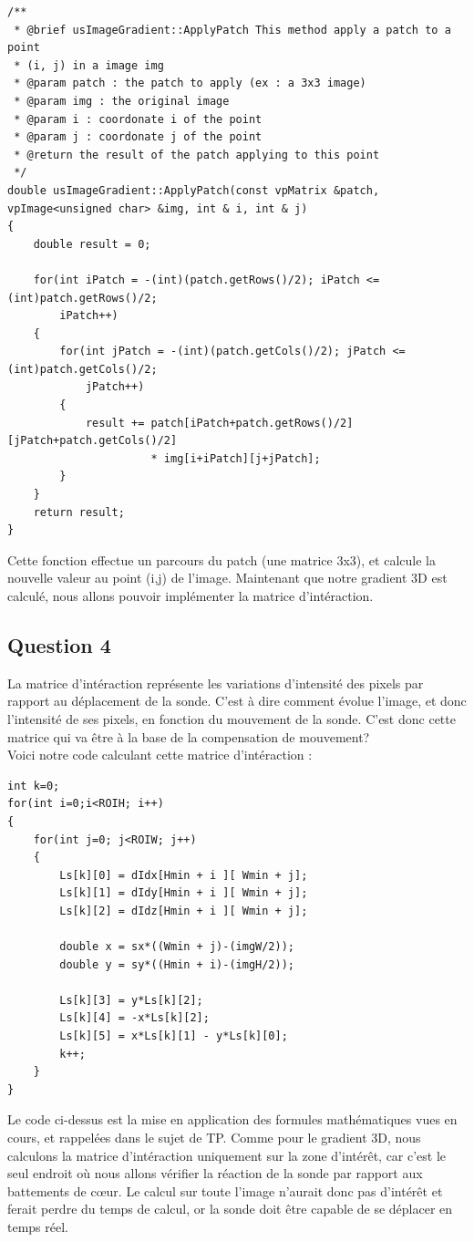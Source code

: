 \documentclass[a4paper,11pt]{article}
\begin{document}
\begin{verbatim}
/**
 * @brief usImageGradient::ApplyPatch This method apply a patch to a point 
 * (i, j) in a image img
 * @param patch : the patch to apply (ex : a 3x3 image)
 * @param img : the original image
 * @param i : coordonate i of the point
 * @param j : coordonate j of the point
 * @return the result of the patch applying to this point
 */
double usImageGradient::ApplyPatch(const vpMatrix &patch, 
vpImage<unsigned char> &img, int & i, int & j) 
{
    double result = 0;

    for(int iPatch = -(int)(patch.getRows()/2); iPatch <= (int)patch.getRows()/2; 
        iPatch++) 
    {
        for(int jPatch = -(int)(patch.getCols()/2); jPatch <= (int)patch.getCols()/2; 
            jPatch++) 
        {
            result += patch[iPatch+patch.getRows()/2][jPatch+patch.getCols()/2] 
            		  * img[i+iPatch][j+jPatch];
        }
    }
    return result;
}
\end{verbatim}
Cette fonction effectue un parcours du patch (une matrice 3x3), et calcule la nouvelle valeur au point (i,j) de l'image. Maintenant que notre gradient 3D est calcul\'e, nous allons pouvoir impl\'ementer la matrice d'int\'eraction.

\subsection{Question 4}
La matrice d'int\'eraction repr\'esente les variations d'intensit\'e des pixels par rapport au d\'eplacement de la sonde. C'est \`a dire comment \'evolue l'image, et donc l'intensit\'e de ses pixels, en fonction du mouvement de la sonde. C'est donc cette matrice qui va \^etre \`a la base de la compensation de mouvement? \\

Voici notre code calculant cette matrice d'int\'eraction :
\begin{verbatim}
int k=0;
for(int i=0;i<ROIH; i++) 
{
    for(int j=0; j<ROIW; j++) 
    {
        Ls[k][0] = dIdx[Hmin + i ][ Wmin + j];
        Ls[k][1] = dIdy[Hmin + i ][ Wmin + j];
        Ls[k][2] = dIdz[Hmin + i ][ Wmin + j];

        double x = sx*((Wmin + j)-(imgW/2));
        double y = sy*((Hmin + i)-(imgH/2));

        Ls[k][3] = y*Ls[k][2];
        Ls[k][4] = -x*Ls[k][2];
        Ls[k][5] = x*Ls[k][1] - y*Ls[k][0];
        k++;
    }
}
\end{verbatim}
Le code ci-dessus est la mise en application des formules math\'ematiques vues en cours, et rappel\'ees dans le sujet de TP. Comme pour le gradient 3D, nous calculons la matrice d'int\'eraction uniquement sur la zone d'int\'er\^et, car c'est le seul endroit o\`u nous allons v\'erifier la r\'eaction de la sonde par rapport aux battements de c\oe ur. Le calcul sur toute l'image n'aurait donc pas d'int\'er\^et et ferait perdre du temps de calcul, or la sonde doit \^etre capable de se d\'eplacer en temps r\'eel. 
\end{document}
